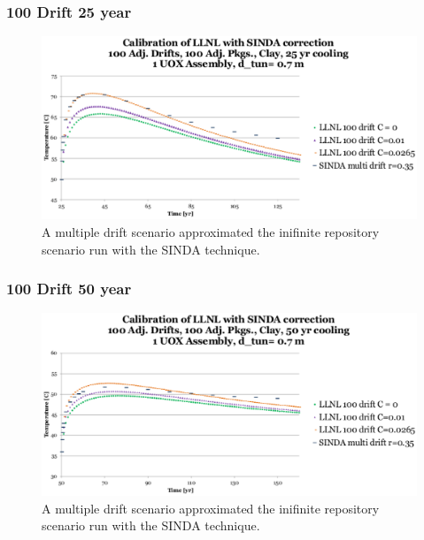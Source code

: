 \begin{frame}[ctb!]
  \frametitle{100 Drift 25 year}
  \begin{figure}[h]
    \begin{center}
      \includegraphics[width=.8\textwidth]{100drift25yr.eps}
      \caption{A multiple drift scenario approximated the inifinite repository 
      scenario run with the SINDA technique.}
    \end{center}
    \label{fig:100drift25yr}
  \end{figure}
  
\end{frame}
\begin{frame}[ctb!]

  \frametitle{100 Drift 50 year}
  \begin{figure}[h]
    \begin{center}
      \includegraphics[width=.8\textwidth]{100drift50yr.eps}
      \caption{A multiple drift scenario approximated the inifinite repository 
      scenario run with the SINDA technique.}
    \end{center}
    \label{fig:100drift50yr}
  \end{figure}
  
\end{frame}

